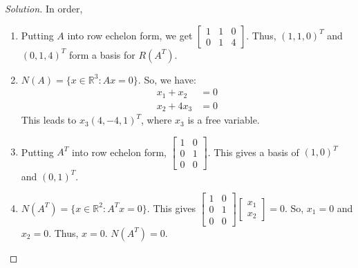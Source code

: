\documentclass{article}
\theoremstyle{mystyle}
\begin{document}
\begin{proof}[Solution]
In order,
\begin{enumerate}
    \item Putting $A$ into row echelon form, we get $\begin{bmatrix} 1 & 1 & 0 \\ 0 & 1 & 4 \end{bmatrix}$. Thus, $(1,1,0)^T$ and $(0,1,4)^T$ form a basis for $R(A^T)$.
    \item $N(A) = \{x\in \mathbb{R}^3: Ax = 0\}$. So, we have:
    \begin{align*}
        x_1 + x_2 &= 0\\
        x_2 + 4x_3 &= 0    
    \end{align*}
This leads to $x_3(4,-4,1)^T$, where $x_3$ is a free variable.
\item Putting $A^T$ into row echelon form, $\begin{bmatrix} 1 & 0 \\ 0 & 1 \\ 0 & 0 \end{bmatrix}$. This gives a basis of $(1,0)^T$ and $(0,1)^T$.
\item $N(A^T) = \{x\in \mathbb{R}^2: A^Tx = 0\}$. This gives $\begin{bmatrix} 1 & 0 \\ 0 & 1 \\ 0 & 0 \end{bmatrix} \begin{bmatrix}x_1 \\ x_2 \end{bmatrix} = 0$. So, $x_1 = 0$ and $x_2 = 0$. Thus, $x=0$. $N(A^T) = 0$.
\end{enumerate}
\end{proof}
\end{document}
